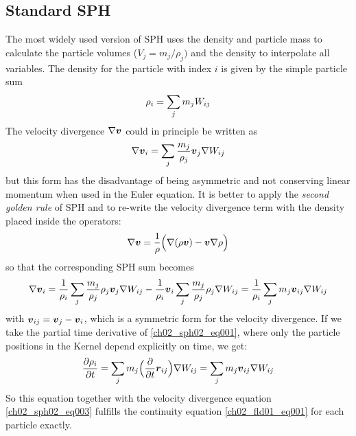 \subsection{Standard SPH}
The most widely used version of SPH uses the density and particle mass to calculate the particle volumes ($V_j = m_j / \rho_j)$ and the density to interpolate all variables. The density for the particle with index $i$ is given by the simple particle sum
\begin{equation}
\label{ch02_sph02_eq001}
\rho_i = \sum_{j} m_j W_{ij}
\end{equation}
The velocity divergence $\nabla \boldsymbol{v}$ could in principle be written as
\begin{equation}
\label{ch02_sph02_eq002}
\nabla \boldsymbol{v}_i = \sum_{j} \frac{m_j}{\rho_j} \boldsymbol{v}_j \nabla W_{ij}
\end{equation}
but this form has the disadvantage of being asymmetric and not conserving linear momentum when used in the Euler equation. It is better to apply the \emph{second golden rule} of SPH \citep{Monaghan:1992p3721} and to re-write the velocity divergence term with the density placed inside the operators:
\begin{equation}
\label{ch02_sph02_eq003}
\nabla \boldsymbol{v} = \frac{1}{\rho} \Big( \nabla (\rho \boldsymbol{v}) - \boldsymbol{v} \nabla \rho \Big)
\end{equation}
so that the corresponding SPH sum becomes 
\begin{equation}
\label{ch02_sph02_eq003}
\nabla \boldsymbol{v}_i = \frac{1}{\rho_i} \sum_{j} \frac{m_j}{\rho_j} \rho_j \boldsymbol{v}_j \nabla W_{ij} - \frac{1}{\rho_i} \boldsymbol{v}_i \sum_{j} \frac{m_j}{\rho_j} \rho_j \nabla W_{ij} = \frac{1}{\rho_i} \sum_{j} m_j \boldsymbol{v}_{ij} \nabla W_{ij} 
\end{equation}
with $\boldsymbol{v}_{ij} = \boldsymbol{v}_j - \boldsymbol{v}_i$, which is a symmetric form for the velocity divergence. If we take the partial time derivative of \ref{ch02_sph02_eq001}, where only the particle positions in the Kernel depend explicitly on time, we get: 
\begin{equation}
\label{ch02_sph02_eq004}
\frac{\partial \rho_i}{\partial t}  = \sum_{j} m_j \Big( \frac{\partial}{\partial t} \boldsymbol{r}_{ij} \Big) \nabla W_{ij} = \sum_{j} m_j \boldsymbol{v}_{ij} \nabla W_{ij} 
\end{equation}
So this equation together with the velocity divergence equation \ref{ch02_sph02_eq003} fulfills the continuity equation \ref{ch02_fld01_eq001} for each particle exactly.

